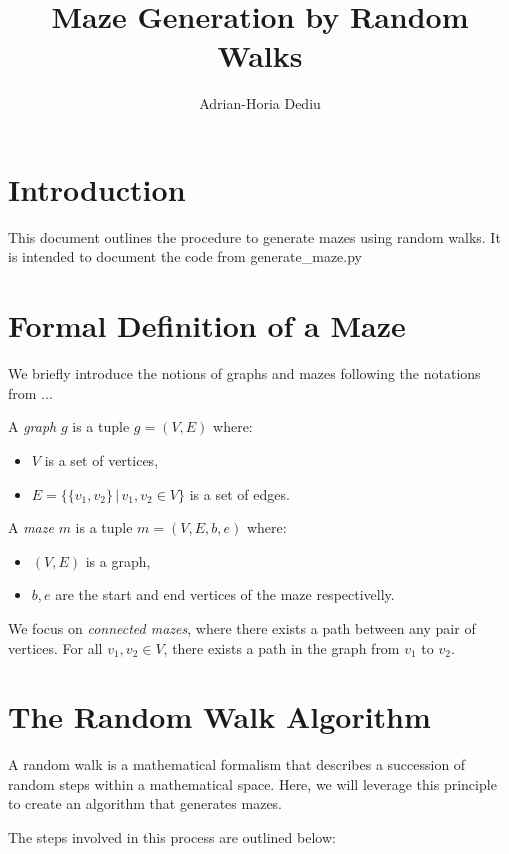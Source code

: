\documentclass{article}
\title{Maze Generation by Random Walks}
\author{Adrian-Horia Dediu}
\begin{document}
\maketitle
\section*{Introduction}
This document outlines the procedure to generate mazes using random walks. It is intended to document the code from generate\_maze.py


\section*{Formal Definition of a Maze}
We briefly introduce the notions of graphs and mazes following the notations from ...

A \emph{graph} $g$ is a tuple $g=(V,E)$ where:
\begin{itemize}
  \item[] $V$ is a set of vertices,
  \item[] $E=\{\{v_1,v_2\} \,|\, v_1, v_2 \in V\}$ is a set of edges.
\end{itemize}

A \emph{maze} $m$ is a tuple $m=(V,E,b,e)$ where:
\begin{itemize}
  \item[] $(V,E)$ is a graph,
  \item[] $b,e$ are the start and end vertices of the maze respectivelly.
\end{itemize}

We focus on \emph{connected mazes}, where there exists a path between any pair of vertices. For all $v_1, v_2 \in V$, there exists a path in the graph from $v_1$ to $v_2$.


\section*{The Random Walk Algorithm}

A random walk is a mathematical formalism that describes a succession of random steps within a mathematical space. Here, we will leverage this principle to create an algorithm that generates mazes.

The steps involved in this process are outlined below:
\end{document}
